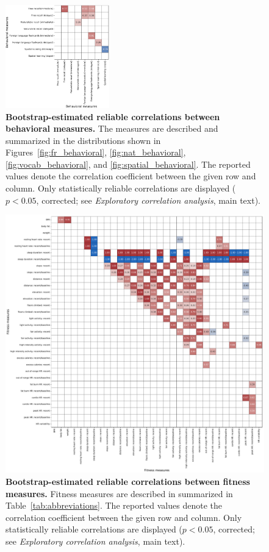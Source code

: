 \documentclass[10pt]{article}
\begin{document}
\begin{figure}[p]
\centering
\includegraphics[width=0.4\textwidth]{figs/behavior_behavior_correlations}
\caption{\textbf{Bootstrap-estimated reliable correlations between
    behavioral measures.}  The measures are described and summarized in the
  distributions shown in Figures~\ref{fig:fr_behavioral},
  \ref{fig:nat_behavioral}, \ref{fig:vocab_behavioral}, and
  \ref{fig:spatial_behavioral}.
The reported values denote the correlation coefficient between the
given row and column.  Only statistically reliable correlations are
displayed ($p < 0.05$, corrected; see \textit{Exploratory correlation
  analysis}, main text).}
\label{fig:behavioral_corrs}
\end{figure}

\begin{figure}[p]
\centering
\includegraphics[width=\textwidth]{figs/fitness_fitness_correlations}
\caption{\textbf{Bootstrap-estimated reliable correlations between
    fitness measures.}  Fitness measures are described in summarized
  in Table~\ref{tab:abbreviations}.  The reported values denote the correlation coefficient between the
given row and column.  Only statistically reliable correlations are
displayed ($p < 0.05$, corrected; see \textit{Exploratory correlation
  analysis}, main text).}
\label{fig:fitness_corrs}
\end{figure}
\end{document}
